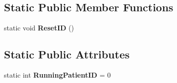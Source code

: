 \subsection*{Static Public Member Functions}
\begin{DoxyCompactItemize}
\item 
static void {\bfseries Reset\+ID} ()\hypertarget{class_general_health_care_elements_1_1_entities_1_1_entity_patient_af8050d2f3448e4c377282b1650230651}{}\label{class_general_health_care_elements_1_1_entities_1_1_entity_patient_af8050d2f3448e4c377282b1650230651}

\end{DoxyCompactItemize}
\subsection*{Static Public Attributes}
\begin{DoxyCompactItemize}
\item 
static int {\bfseries Running\+Patient\+ID} = 0\hypertarget{class_general_health_care_elements_1_1_entities_1_1_entity_patient_ac2cdc899ba0578ebd8e8fc3485d4b3f3}{}\label{class_general_health_care_elements_1_1_entities_1_1_entity_patient_ac2cdc899ba0578ebd8e8fc3485d4b3f3}

\end{DoxyCompactItemize}
